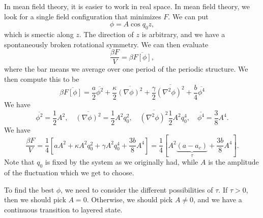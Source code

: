 \documentclass[a4paper]{article}
\begin{document}
In mean field theory, it is easier to work in real space. In mean field theory, we look for a single field configuration that minimizes $F$. We can put
\[
  \phi = A \cos q_0 z,
\]
which is smectic along $z$. The direction of $z$ is arbitrary, and we have a spontaneously broken rotational symmetry. We can then evaluate
\[
  \frac{\beta F}{V} = \beta \overline{F[\phi]},
\]
where the bar means we average over one period of the periodic structure. We then compute this to be
\[
  \beta \overline{F[\phi]} = \frac{a}{2} \overline{\phi^2} + \frac{\kappa}{2} \overline{(\nabla \phi)^2} + \frac{\gamma}{2} \overline{(\nabla^2 \phi)^2} + \frac{b}{4} \overline{\phi^4}
\]
We have
\[
  \overline{\phi^2} = \frac{1}{2} A^2,\quad \overline{(\nabla \phi)^2} = \frac{1}{2} A^2 q_0^2,\quad \overline{(\nabla^2 \phi)^2} \frac{1}{2} A^2 q_0^4,\quad \overline{\phi^4} = \frac{3}{8} A^4.
\]
We have
\[
  \frac{\beta F}{V} = \frac{1}{4} \left[aA^2 + \kappa A^2 q_0^2 + \gamma A^2 q_0^4 + \frac{3b}{8} A^4\right] = \frac{1}{4} \left[ A^2 \underbrace{(a - a_c)}_\tau + \frac{3b}{8} A^4\right].
\]
Note that $q_0$ is fixed by the system as we originally had, while $A$ is the amplitude of the fluctuation which we get to choose.
\begin{center}
\end{center}
To find the best $\phi$, we need to consider the different possibilities of $\tau$. If $\tau > 0$, then we should pick $A = 0$. Otherwise, we should pick $A \not= 0$, and we have a continuous transition to layered state.
\end{document}
